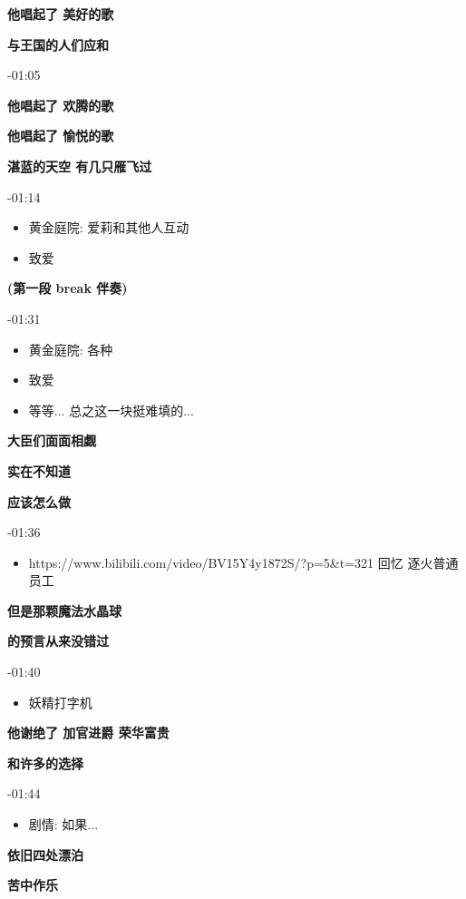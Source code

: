 \documentclass[a4paper]{article}
\begin{document}
\textbf{他唱起了 美好的歌}

\textbf{与王国的人们应和}

-01:05

\textbf{他唱起了 欢腾的歌}

\textbf{他唱起了 愉悦的歌}

\textbf{湛蓝的天空 有几只雁飞过}

-01:14

\begin{itemize}
    \item 黄金庭院: 爱莉和其他人互动
    \item 致爱
\end{itemize}

\textbf{(第一段 break 伴奏)}

-01:31

\begin{itemize}
    \item 黄金庭院: 各种
    \item 致爱
    \item 等等... 总之这一块挺难填的...
\end{itemize}

\textbf{大臣们面面相觑}

\textbf{实在不知道}

\textbf{应该怎么做}

-01:36

\begin{itemize}
    \item https://www.bilibili.com/video/BV15Y4y1872S/?p=5&t=321 回忆 逐火普通员工
\end{itemize}

\textbf{但是那颗魔法水晶球}

\textbf{的预言从来没错过}

-01:40

\begin{itemize}
    \item 妖精打字机
\end{itemize}

\textbf{他谢绝了 加官进爵 荣华富贵}

\textbf{和许多的选择}

-01:44

\begin{itemize}
    \item 剧情: 如果...
\end{itemize}

\textbf{依旧四处漂泊}

\textbf{苦中作乐}
\end{document}
